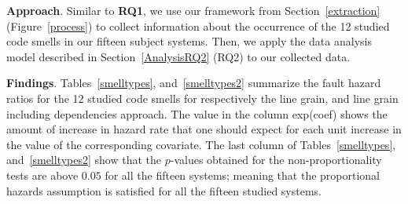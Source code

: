 \documentclass[smallcondensed]{svjour3}
\begin{document}
\textbf{Approach}. Similar to \textbf{RQ1}, we use our framework from Section~\ref{extraction} (Figure~\ref{process}) to collect information about the occurrence of the 12 studied code smells in our fifteen subject systems. Then, we apply the data analysis model described in Section~\ref{AnalysisRQ2} (RQ2) to our collected data.

\textbf{Findings}. Tables~\ref{smelltypes}, and~\ref{smelltypes2} summarize the fault hazard ratios for the 12 studied code smells for respectively the line grain, and line grain including dependencies approach. The value in the column exp(coef) shows the amount of increase in hazard rate that one should expect for each unit increase in the value of the corresponding covariate. %
The last column of Tables~\ref{smelltypes}, and~\ref{smelltypes2} show that the $p$-values obtained for the non-proportionality tests are above $0.05$ for all the fifteen systems; meaning that the proportional hazards assumption is satisfied for all the fifteen studied systems. 
%
\end{document}

